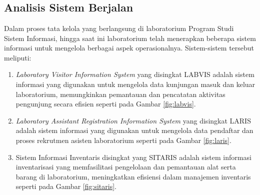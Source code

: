 %
%
%
%


\chapter{\babEmpat}
\section{Analisis Sistem Berjalan}
Dalam proses tata kelola yang berlangsung di laboratorium Program Studi Sistem Informasi, hingga saat ini laboratorium telah menerapkan beberapa sistem informasi untuk mengelola berbagai aspek operasionalnya. Sistem-sistem tersebut meliputi:

\begin{enumerate}
	\item \textit{Laboratory Visitor Information System} yang disingkat LABVIS adalah sistem informasi yang digunakan untuk mengelola data kunjungan masuk dan keluar laboratorium, memungkinkan pemantauan dan pencatatan aktivitas pengunjung secara efisien seperti pada Gambar \ref{fig:labvis}.

	\item \textit{Laboratory Assistant Registration Information System} yang disingkat LARIS adalah sistem informasi yang digunakan untuk mengelola data pendaftar dan proses rekrutmen asisten laboratorium seperti pada Gambar \ref{fig:laris}.

	\item Sistem Informasi Inventaris disingkat yang SITARIS adalah sistem informasi inventarisasi yang memfasilitasi pengelolaan dan pemantauan alat serta barang di laboratorium, meningkatkan efisiensi dalam manajemen inventaris seperti pada Gambar \ref{fig:sitaris}.
\end{enumerate}

